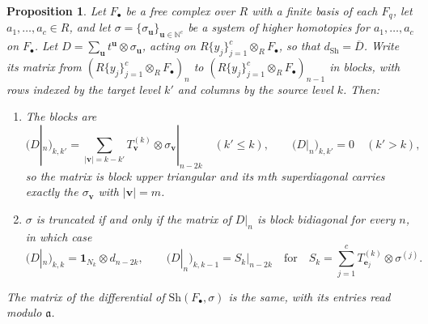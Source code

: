 \documentclass[12pt]{amsart}
\theoremstyle{plain}
\newtheorem{proposition}[theorem]{Proposition}
\theoremstyle{definition}
\newcommand{\F}{ {F_\bullet} }
\newcommand{\aaa}{\mathfrak{a}}
\newcommand{\N}{\mathbb{N}}
\newcommand{\Sh}{\mathrm{Sh}}
\begin{document}
\begin{proposition}\label{prop:blocks}
    Let $\F$ be a free complex over $R$ with a finite basis of each $F_q$, let $a_1, \dots, a_c \in R$, and let $\sigma = \{\sigma_{\boldsymbol{u}}\}_{\boldsymbol{u} \in \N^c}$ be a system of higher homotopies for $a_1, \dots, a_c$ on $\F$. Let ${D = \sum_{\boldsymbol{u}} t^{\boldsymbol{u}} \otimes \sigma_{\boldsymbol{u}}}$, acting on $R\{y_j\}_{j=1}^{c} \otimes_R \F$, so that $d_{\Sh} = \overline{D}$. Write its matrix from $(R\{y_j\}_{j=1}^{c} \otimes_R \F)_n$ to $(R\{y_j\}_{j=1}^{c} \otimes_R \F)_{n-1}$ in blocks, with rows indexed by the target level $k'$ and columns by the source level $k$. Then:
    \begin{enumerate}[label=(\arabic*),leftmargin=*,itemsep=1pt]
        \item The blocks are
        \[ \bigl(D|_n\bigr)_{k,k'} = \sum_{|\boldsymbol{v}| = k - k'} T^{(k)}_{\boldsymbol{v}} \otimes \sigma_{\boldsymbol{v}}|_{n-2k} \quad (k' \le k), \qquad \bigl(D|_n\bigr)_{k,k'} = 0 \quad (k' > k),
        \]
        so the matrix is block upper triangular and its $m$th superdiagonal carries exactly the $\sigma_{\boldsymbol{v}}$ with $|\boldsymbol{v}| = m$.

        \item $\sigma$ is truncated if and only if the matrix of $D|_n$ is block bidiagonal for every $n$, in which case
        \[
            \bigl(D|_n\bigr)_{k,k} = \mathbf{1}_{N_k} \otimes d_{n-2k}, \qquad \bigl(D|_n\bigr)_{k,k-1} = S_k|_{n-2k} \quad \text{for} \quad S_k = \sum_{j=1}^{c} T^{(k)}_{\boldsymbol{e}_j} \otimes \sigma^{(j)} .
        \]
    \end{enumerate}
    The matrix of the differential of $\Sh(\F, \sigma)$ is the same, with its entries read modulo $\aaa$.
\end{proposition}
\end{document}
